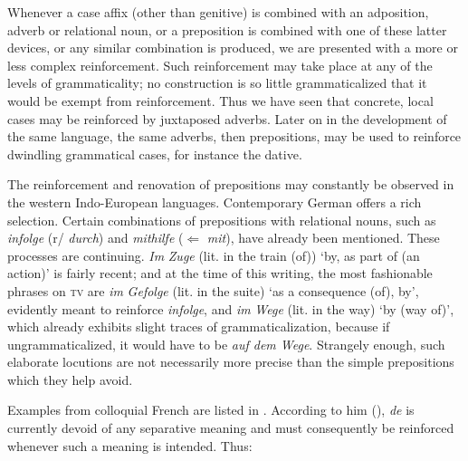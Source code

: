 Whenever a case affix (other than genitive) is combined with an adposition, adverb or relational noun, or a preposition is combined with one of these latter devices, or any similar combination is produced, we are presented with a more or less complex reinforcement. Such reinforcement may take place at any of the levels of grammaticality; no construction is so little grammaticalized that it would be exempt from reinforcement. Thus we have seen that concrete, local cases may be reinforced by juxtaposed adverbs. Later on in the development of the same language, the same adverbs, then prepositions, may be used to reinforce dwindling grammatical cases, for instance the dative.

The reinforcement and renovation of prepositions may constantly be observed in the western Indo-European languages. Contemporary German offers a rich selection. Certain combinations of prepositions with relational nouns, such as \textit{infolge} (r/ \textit{durch}) and \textit{mithilfe} ($\Leftarrow $ \textit{mit}), have already been mentioned. These processes are continuing. \textit{Im} \textit{Zuge} (lit. in the train (of)) ‘by, as part of (an action)’ is fairly recent; and at the time of this writing, the most fashionable phrases on \textsc{tv} are \textit{im} \textit{Gefolge} (lit. in the suite) ‘as a consequence (of), by’, evidently meant to reinforce \textit{infolge}, and \textit{im} \textit{Wege} (lit. in the way) ‘by (way of)’, which already exhibits slight traces of grammaticalization, because if ungrammaticalized, it would have to be \textit{auf dem Wege}. Strangely enough, such elaborate locutions are not necessarily more precise than the simple prepositions which they help avoid.

Examples from colloquial French are listed in \citet{Frei1929}. According to him (\citeyear[72f]{Frei1929}), \textit{de} is currently devoid of any separative meaning and must consequently be reinforced whenever such a meaning is intended. Thus:


